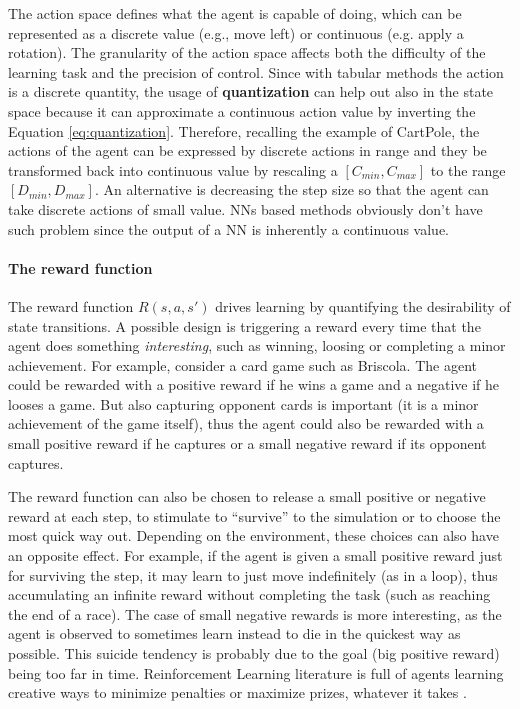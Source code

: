 The action space defines what the agent is capable of doing, which can be represented as a discrete value (e.g., move left) or continuous (e.g. apply a rotation).
The granularity of the action space affects both the difficulty of the learning task and the precision of control.
Since with tabular methods the action is a discrete quantity, the usage of \textbf{quantization} can help out also in the state space because it can approximate a continuous action value by inverting the Equation \ref{eq:quantization}. Therefore, recalling the example of CartPole, the actions of the agent can be expressed by discrete actions in range and they be transformed back into continuous value by rescaling a $[C_{min}, C_{max}]$ to the range $[D_{min}, D_{max}]$. An alternative is decreasing the step size so that the agent can take discrete actions of small value.
NNs based methods obviously don't have such problem since the output of a NN is inherently a continuous value.

\paragraph{The reward function}

The reward function $R(s, a, s')$ drives learning by quantifying the desirability of state transitions.
A possible design is triggering a reward every time that the agent does something \textit{interesting}, such as winning, loosing or completing a minor achievement.
For example, consider a card game such as Briscola. The agent could be rewarded with a positive reward if he wins a game and a negative if he looses a game.
But also capturing opponent cards is important (it is a minor achievement of the game itself), thus the agent could also be rewarded with a small positive reward if he captures or a small negative reward if its opponent captures.

The reward function can also be chosen to release a small positive or negative reward at each step, to stimulate to ``survive'' to the simulation or to choose the most quick way out. Depending on the environment, these choices can also have an opposite effect. For example, if the agent is given a small positive reward just for surviving the step, it may learn to just move indefinitely (as in a loop), thus accumulating an infinite reward without completing the task (such as reaching the end of a race). The case of small negative rewards is more interesting, as the agent is observed to sometimes learn instead to die in the quickest way as possible. This suicide tendency is probably due to the goal (big positive reward) being too far in time. Reinforcement Learning literature is full of agents learning creative ways to minimize penalties or maximize prizes, whatever it takes \cite{10.1162/artl_a_00319}.

